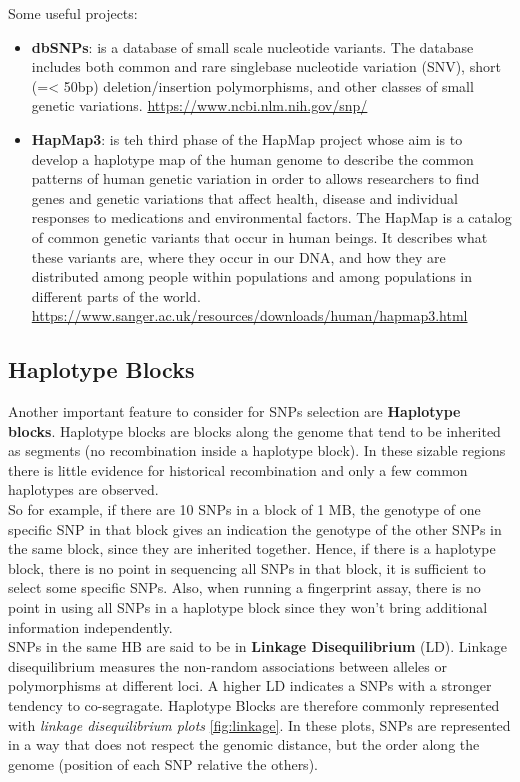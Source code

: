 \bigskip
Some useful projects:
\begin{itemize}
	\item \textbf{dbSNPs}: is a database of small scale nucleotide variants. The database includes both common and rare singlebase nucleotide variation (SNV), short (=< 50bp) deletion/insertion polymorphisms, and other classes of small genetic variations.
	\url{https://www.ncbi.nlm.nih.gov/snp/}

	\item \textbf{HapMap3}: is teh third phase of the HapMap project whose aim is to develop a haplotype map of the human genome to describe the common patterns of human genetic variation in order to allows researchers to find genes and genetic variations that affect health, disease and individual responses to medications and environmental factors. The HapMap is a catalog of common genetic variants that occur in human beings. It describes what these variants are, where they occur in our DNA, and how they are distributed among people within populations and among populations in different parts of the world.
	\url{https://www.sanger.ac.uk/resources/downloads/human/hapmap3.html}
\end{itemize}

\subsection{Haplotype Blocks}

Another important feature to consider for SNPs selection are \textbf{Haplotype blocks}. Haplotype blocks are blocks along the genome that tend to be inherited as segments (no recombination inside a haplotype block). In these sizable regions there is little evidence for historical recombination and only a few common haplotypes are observed. \\

So for example, if there are 10 SNPs in a block of 1 MB, the genotype of one specific SNP in that block gives an indication the genotype of the other SNPs in the same block, since they are inherited together.
Hence, if there is a haplotype block, there is no point in sequencing all SNPs in that block, it is sufficient to select some specific SNPs. Also, when running a fingerprint assay, there is no point in using all SNPs in a haplotype block since they won't bring additional information independently.\\

SNPs in the same HB are said to be in \textbf{Linkage Disequilibrium} (LD). Linkage disequilibrium measures the non-random associations between alleles or polymorphisms at different loci. A higher LD indicates a SNPs with a stronger tendency to co-segragate.
Haplotype Blocks are therefore commonly represented with \emph{linkage disequilibrium plots} \ref{fig:linkage}. In these plots, SNPs are represented in a way that does not respect the genomic distance, but the order along the genome (position of each SNP relative the others).

